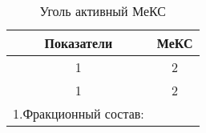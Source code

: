 
\begin{center}
    \small
    \begin{longtable}{m{12cm}c}
        \caption{Уголь активный МеКС}
        \label{tabular:meks} \\
        \hline
        \multicolumn{1}{c}{Показатели}&МеКС\\
        \hline
        \multicolumn{1}{c}{1}&\multicolumn{1}{c}{2}\\
        \hline \endfirsthead%
        \hline
        \multicolumn{1}{c}{1}&\multicolumn{1}{c}{2}\\
        \hline \endhead
        1.Фракционный состав:&\\


        \hline
    \end{longtable}
\end{center}
